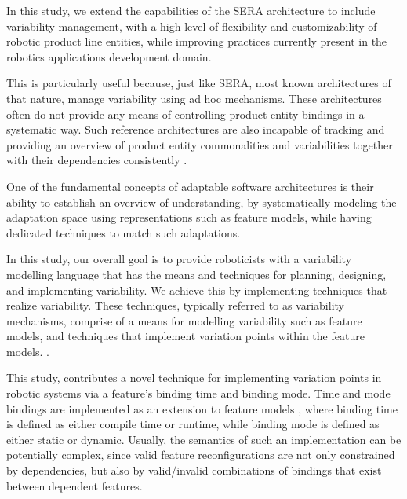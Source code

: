\documentclass[conference]{IEEEtran}
\begin{document}
In this study, we extend the capabilities of the SERA architecture to include variability management, with a high level of flexibility and customizability of robotic product line entities, while improving practices currently present in the robotics applications development domain.

This is particularly useful because, just like SERA, most known architectures of that nature, manage variability using ad hoc mechanisms. These architectures often do not provide any means of controlling product entity bindings in a systematic way. Such reference architectures are also incapable of tracking and providing an overview of product entity commonalities and variabilities together with their dependencies consistently \cite{var-mod-ind}.

One of the fundamental concepts of adaptable software architectures is their ability to establish an overview of understanding, by systematically modeling the adaptation space using representations such as feature models, while having dedicated techniques to match such adaptations.

In this study, our overall goal is to provide roboticists with a variability modelling language that has the means and techniques for planning, designing, and implementing variability. We achieve this by implementing techniques that realize variability. These techniques, typically referred to as variability mechanisms, comprise of a means for modelling variability such as feature models, and techniques that implement variation points within the feature models. \cite{var-mod-ind}.

This study, contributes a novel technique for implementing variation points in robotic systems via a feature's binding time and binding mode. Time and mode bindings are implemented as an extension to feature models \cite{flex-feat-bind}, where binding time is defined as either compile time or runtime, while binding mode is defined as either static or dynamic. Usually, the semantics of such an implementation can be potentially complex, since valid feature reconfigurations are not only constrained by dependencies, but also by valid/invalid combinations of bindings that exist between dependent features.
\end{document}
